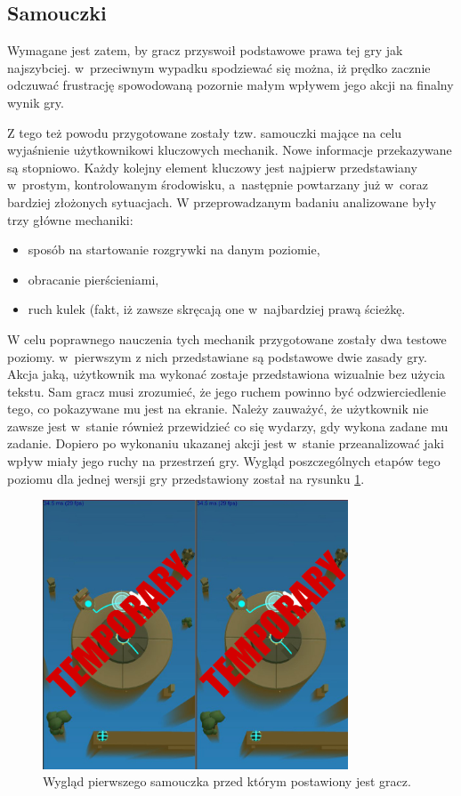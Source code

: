 \documentclass[a4paper,12pt,numbers=noenddot]{report}
\begin{document}
	\subsection{Samouczki}
Wymagane jest zatem, by gracz przyswoił podstawowe prawa tej gry jak najszybciej. w~przeciwnym wypadku spodziewać się można, iż prędko zacznie odczuwać frustrację spowodowaną pozornie małym wpływem jego akcji na finalny wynik gry. 

Z tego też powodu przygotowane zostały tzw. samouczki mające na celu wyjaśnienie użytkownikowi kluczowych mechanik. Nowe informacje przekazywane są stopniowo. Każdy kolejny element kluczowy jest najpierw przedstawiany w~prostym, kontrolowanym środowisku, a~następnie powtarzany już w~coraz bardziej złożonych sytuacjach. 
W przeprowadzanym badaniu analizowane były trzy główne mechaniki: 
\begin{itemize}
\item sposób na startowanie rozgrywki na danym poziomie, 
\item obracanie pierścieniami,
\item ruch kulek (fakt, iż zawsze skręcają one w~najbardziej prawą ścieżkę.
\end{itemize}

W celu poprawnego nauczenia tych mechanik przygotowane zostały dwa testowe poziomy. w~pierwszym z nich przedstawiane są podstawowe dwie zasady gry. Akcja jaką, użytkownik ma wykonać zostaje przedstawiona wizualnie bez użycia tekstu. Sam gracz musi zrozumieć, że jego ruchem powinno być odzwierciedlenie tego, co pokazywane mu jest na ekranie. Należy zauważyć, że użytkownik nie zawsze jest w~stanie również przewidzieć co się wydarzy, gdy wykona zadane mu zadanie. Dopiero po wykonaniu ukazanej akcji jest w~stanie przeanalizować jaki wpływ miały jego ruchy na przestrzeń gry.
Wygląd poszczególnych etapów tego poziomu dla jednej wersji gry przedstawiony został na rysunku \ref{fig:tut_L1_1}.

\begin{figure}[h!]
	\centering
  	\includegraphics[height=8cm]{fig/tmp2.jpg}
	\caption{Wygląd pierwszego samouczka przed którym postawiony jest gracz.}
	\label{fig:tut_L1_1}
\end{figure}
\end{document}
